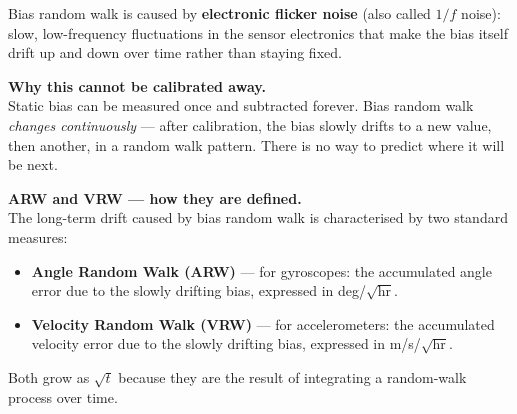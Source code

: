 \documentclass[12pt, a4paper]{article}
\begin{document}
Bias random walk is caused by \textbf{electronic flicker noise}
(also called $1/f$ noise): slow, low-frequency fluctuations in the
sensor electronics that make the bias itself drift up and down over
time rather than staying fixed.

\begin{warnbox}
  \textbf{Why this cannot be calibrated away.}\\
  Static bias can be measured once and subtracted forever.
  Bias random walk \emph{changes continuously} --- after calibration,
  the bias slowly drifts to a new value, then another, in a random
  walk pattern.
  There is no way to predict where it will be next.\\[4pt]
\end{warnbox}

\begin{notebox}
  \textbf{ARW and VRW --- how they are defined.}\\
  The long-term drift caused by bias random walk is characterised by
  two standard measures:
  \begin{itemize}[leftmargin=1.4em, topsep=2pt]
    \item \textbf{Angle Random Walk (ARW)} --- for gyroscopes: the
          accumulated angle error due to the slowly drifting bias,
          expressed in deg/$\sqrt{\text{hr}}$.
    \item \textbf{Velocity Random Walk (VRW)} --- for accelerometers:
          the accumulated velocity error due to the slowly drifting
          bias, expressed in m/s/$\sqrt{\text{hr}}$.
  \end{itemize}
  Both grow as $\sqrt{t}$ because they are the result of integrating
  a random-walk process over time.
\end{notebox}
\end{document}
